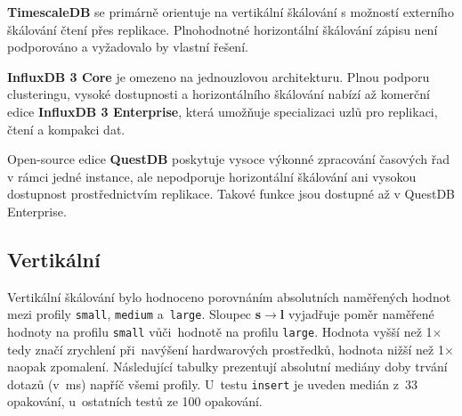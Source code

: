 \textbf{TimescaleDB} se primárně orientuje na vertikální škálování s možností externího škálování čtení přes replikace. Plnohodnotné horizontální škálování zápisu není podporováno a vyžadovalo by vlastní řešení.

\textbf{InfluxDB 3 Core} je omezeno na jednouzlovou architekturu. Plnou podporu clusteringu, vysoké dostupnosti a horizontálního škálování nabízí až komerční edice \textbf{InfluxDB 3 Enterprise}, která umožňuje specializaci uzlů pro replikaci, čtení a kompakci dat.

Open-source edice \textbf{QuestDB} poskytuje vysoce výkonné zpracování časových řad v rámci jedné instance, ale nepodporuje horizontální škálování ani vysokou dostupnost prostřednictvím replikace. Takové funkce jsou dostupné až v QuestDB Enterprise.

\subsection{Vertikální}

Vertikální škálování bylo hodnoceno porovnáním absolutních naměřených hodnot mezi profily \texttt{small}, \texttt{medium} a~\texttt{large}.
Sloupec \textbf{s$\rightarrow$l} vyjadřuje poměr naměřené hodnoty na profilu \texttt{small} vůči~hodnotě na profilu \texttt{large}. 
Hodnota vyšší než 1$\times$ tedy značí zrychlení při~navýšení hardwarových prostředků, hodnota nižší než 1$\times$ naopak zpomalení. 
Následující tabulky prezentují absolutní mediány doby trvání dotazů (v~ms) napříč všemi profily. 
U~testu \texttt{insert} je uveden medián z~33 opakování, u~ostatních testů ze 100 opakování.

